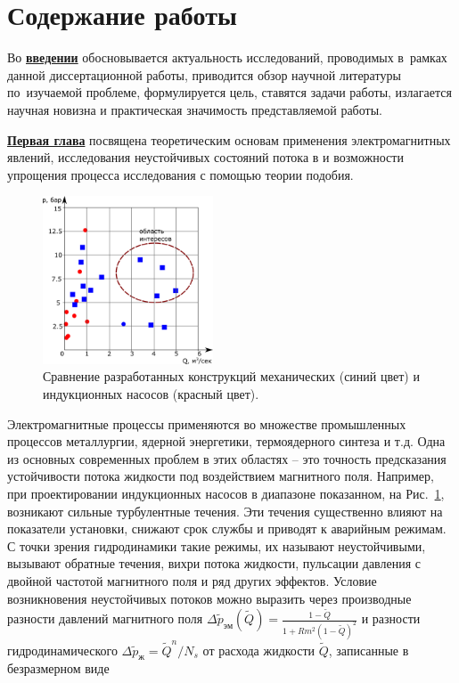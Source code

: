 \section*{Содержание работы}
Во \underline{\textbf{введении}} обосновывается актуальность
исследований, проводимых в~рамках данной диссертационной работы,
приводится обзор научной литературы по~изучаемой проблеме,
формулируется цель, ставятся задачи работы, излагается научная новизна
и практическая значимость представляемой работы.

\underline{\textbf{Первая глава}} посвящена теоретическим основам применения электромагнитных явлений,  исследования неустойчивых состояний потока в  и возможности упрощения процесса исследования с помощью теории подобия. 
\begin{figure}
	\centering
	\includegraphics[width=0.45\textwidth]{Synopsis/images/part1/pQ_ru.png}
	\caption{Сравнение разработанных конструкций механических (синий цвет) и индукционных насосов (красный цвет).}
	\label{fig:intreting_pq}	
\end{figure}
Электромагнитные процессы применяются во множестве промышленных процессов металлургии, ядерной энергетики, термоядерного синтеза и т.д. Одна из основных современных проблем в этих областях -- это точность предсказания устойчивости потока жидкости под воздействием магнитного поля. Например, при проектировании индукционных насосов в диапазоне показанном, на Рис.~\ref{fig:intreting_pq}, возникают сильные турбулентные течения. Эти течения существенно влияют на показатели установки, снижают срок службы и приводят к аварийным режимам. С точки зрения гидродинамики такие режимы, их называют неустойчивыми, вызывают обратные течения, вихри потока жидкости, пульсации давления с двойной частотой магнитного поля и ряд других эффектов. Условие возникновения неустойчивых потоков можно выразить через производные разности давлений магнитного поля $\Delta \widetilde{p}_{эм}(\widetilde{Q}) = \frac{1-\widetilde{Q}}{1+Rm^2 (1-\widetilde{Q} )^2}$  и разности гидродинамического $\Delta \widetilde{p}_{ж} = \widetilde{Q}^n / N_s $ от расхода жидкости $\widetilde{Q}$, записанные в безразмерном виде

